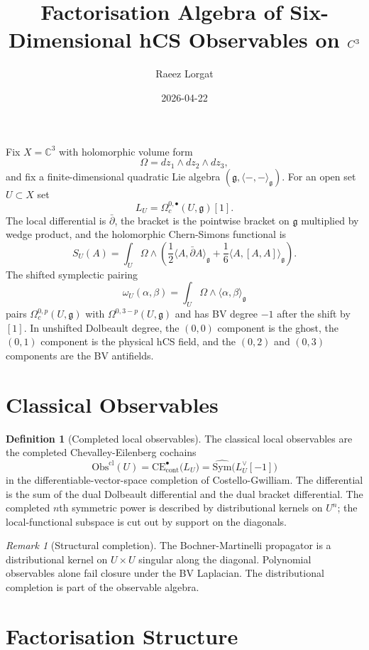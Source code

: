 \documentclass[11pt]{amsart}
\title{Factorisation Algebra of Six-Dimensional hCS Observables on $\C^3$}
\author{Raeez Lorgat}
\date{2026-04-22}
\providecommand{\C}{\mathbb{C}}
\providecommand{\dbar}{\bar{\partial}}
\providecommand{\g}{\mathfrak{g}}
\providecommand{\Obs}{\mathrm{Obs}}
\providecommand{\Sym}{\mathrm{Sym}}
\providecommand{\CE}{\mathrm{CE}}
\theoremstyle{plain}
\theoremstyle{definition}
\newtheorem{definition}[theorem]{Definition}
\theoremstyle{remark}
\newtheorem{remark}[theorem]{Remark}
\begin{document}
\maketitle

Fix $X=\C^3$ with holomorphic volume form
\[
 \Omega=dz_1\wedge dz_2\wedge dz_3,
\]
and fix a finite-dimensional quadratic Lie algebra
$(\g,\langle-,-\rangle_\g)$. For an open set $U\subset X$ set
\[
 L_U=\Omega_c^{0,\bullet}(U,\g)[1].
\]
The local differential is $\dbar$, the bracket is the pointwise bracket
on $\g$ multiplied by wedge product, and the holomorphic Chern-Simons
functional is
\[
 S_U(A)=\int_U \Omega\wedge
 \left(\frac{1}{2}\langle A,\dbar A\rangle_\g
 +\frac{1}{6}\langle A,[A,A]\rangle_\g\right).
\]
The shifted symplectic pairing
\[
 \omega_U(\alpha,\beta)=\int_U\Omega\wedge
 \langle\alpha,\beta\rangle_\g
\]
pairs $\Omega^{0,p}_c(U,\g)$ with $\Omega^{0,3-p}(U,\g)$ and has BV
degree $-1$ after the shift by $[1]$. In unshifted Dolbeault degree,
the $(0,0)$ component is the ghost, the $(0,1)$ component is the
physical hCS field, and the $(0,2)$ and $(0,3)$ components are the BV
antifields.

\section{Classical Observables}

\begin{definition}[Completed local observables]\label{def:e2-local-observables}
The classical local observables are the completed Chevalley-Eilenberg
cochains
\[
 \Obs^{\mathrm{cl}}(U)
 =
 \CE^\bullet_{\mathrm{cont}}\bigl(L_U\bigr)
 =
 \widehat{\Sym}\bigl(L_U^\vee[-1]\bigr)
\]
in the differentiable-vector-space completion of Costello-Gwilliam.
The differential is the sum of the dual Dolbeault differential and the
dual bracket differential. The completed $n$th symmetric power is
described by distributional kernels on $U^n$; the local-functional
subspace is cut out by support on the diagonals.
\end{definition}

\begin{remark}[Structural completion]\label{rem:e2-completion}
The Bochner-Martinelli propagator is a distributional kernel on
$U\times U$ singular along the diagonal. Polynomial observables alone
fail closure under the BV Laplacian. The distributional completion is
part of the observable algebra.
\end{remark}

\section{Factorisation Structure}
\end{document}

